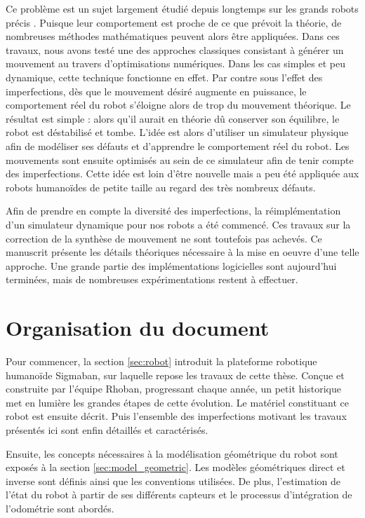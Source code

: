 Ce problème est un sujet largement étudié depuis longtemps
sur les grands robots \og précis \fg.
Puisque leur comportement est proche de ce que prévoit la théorie, 
de nombreuses méthodes mathématiques peuvent alors être appliquées.
Dans ces travaux, nous avons testé une des approches classiques
consistant à générer un mouvement au travers d'optimisations numériques.
Dans les cas simples et peu dynamique, cette technique fonctionne en effet.
Par contre sous l'effet des imperfections, dès que le mouvement désiré 
augmente en puissance, le comportement réel du robot s'éloigne 
alors de trop du mouvement théorique.
Le résultat est simple : alors qu'il aurait en théorie dû conserver son équilibre, 
le robot est déstabilisé et tombe.
L'idée est alors d'utiliser un simulateur physique afin de modéliser ses
défauts et d'apprendre le comportement réel du robot.
Les mouvements sont ensuite optimisés au sein de ce simulateur afin de tenir
compte des imperfections.
Cette idée est loin d'être nouvelle mais a peu été appliquée aux 
robots humanoïdes de petite taille au regard des très nombreux défauts.

Afin de prendre en compte la diversité des imperfections,
la réimplémentation d'un simulateur dynamique pour nos robots a été commencé.
Ces travaux sur la correction de la synthèse de mouvement ne sont toutefois
pas achevés. Ce manuscrit présente les détails théoriques nécessaire
à la mise en oeuvre d'une telle approche. Une grande partie des implémentations
logicielles sont aujourd'hui terminées, mais de nombreuses expérimentations restent 
à effectuer.

\section{Organisation du document}

Pour commencer, la section \ref{sec:robot} introduit la plateforme
robotique humanoïde Sigmaban, sur laquelle repose les travaux de cette thèse.
Conçue et construite par l'équipe Rhoban, progressant chaque année, 
un petit historique met en lumière les grandes étapes de cette évolution.
Le matériel constituant ce robot est ensuite décrit. 
Puis l'ensemble des imperfections motivant les travaux présentés ici 
sont enfin détaillés et caractérisés.

Ensuite, les concepts nécessaires à la modélisation géométrique du robot
sont exposés à la section \ref{sec:model_geometric}.
Les modèles géométriques direct et inverse sont définis ainsi que les conventions
utilisées. De plus, l'estimation de l'état du robot à partir de ses différents capteurs 
et le processus d'intégration de l'odométrie sont abordés.

